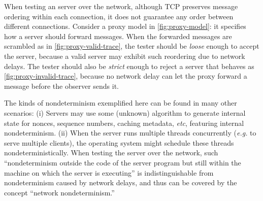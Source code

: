 When testing an \http server over the network, although TCP preserves message
ordering within each connection, it does not guarantee any order between
different connections.  Consider a proxy model in \autoref{fig:proxy-model}: it
specifies {how} a server should forward messages.   
When the forwarded messages are scrambled as in \autoref{fig:proxy-valid-trace},
the tester should be {\em loose} enough to accept the server, because a valid
server may exhibit such reordering due to network delays.  The tester should
also be {\em strict} enough to reject a server that behaves as
\autoref{fig:proxy-invalid-trace}, because no network delay can let the proxy
forward a message before the observer sends it.

The kinds of nondeterminism exemplified here can be found in many other
scenarios: (i) Servers may use some (unknown) algorithm to generate internal
state for nonces, sequence numbers, caching metadata, {\it etc}, featuring
internal nondeterminism.  (ii) When the server runs multiple threads
concurrently ({\it e.g.} to serve multiple clients), the operating system might
schedule these threads nondeterministically.  When testing the server over the
network, such ``nondeterminism outside the code of the server program but still
within the machine on which the server is executing'' is indistinguishable from
nondeterminism caused by network delays, and thus can be covered by the concept
``network nondeterminism.''

